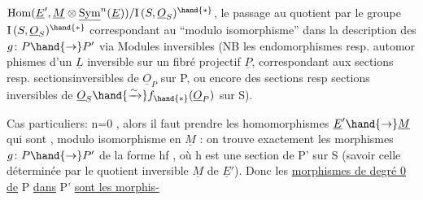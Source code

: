 $\mathrm{Hom}(\underline{E}',\underline{M}\otimes\underline{\mathrm{Sym}}^{n}(\underline{E}))/\mathrm{I}\,(S,\underline{O}_S)^{\hand{*}}$,  le passage au quotient par le groupe
$\mathrm{I}\,(S,\underline{O}_S)^{\hand{*}}$ correspondant  au  ``modulo isomorphisme'' dans la description
des $g\colon P \hand{\to} P'$ via Modules inversibles  (NB  les endomorphismes resp. automor
phismes d'un $\underline{L}$ inversible sur un fibré projectif $\underline{P}$, correspondant aux
sections resp. sections\hand{/}inversibles de $\underline{O}_P$ sur P,  ou encore des sections
resp sections inversibles de $\underline{O}_S \hand{\xrightarrow{\sim}} f_{\hand{*}}(\underline{O}_P)$ sur S).

Cas particuliers:  n=0 , alors  il faut prendre  les  homomorphismes
$\underline{E}' \hand{\to} \underline{M}$  qui sont , modulo isomorphisme en $\underline{M}$ : on trouve
exactement les  morphismes  $g\colon P \hand{\to} P'$  de la forme  hf , où  h est une
section de  P' sur S  (savoir celle déterminée par  le quotient inversible
$\underline{M}$ de $\underline{E}'$). Donc les \uline{morphismes de  degré 0}  \uline{de} P \uline{dans} P' \uline{sont les morphis-}%

